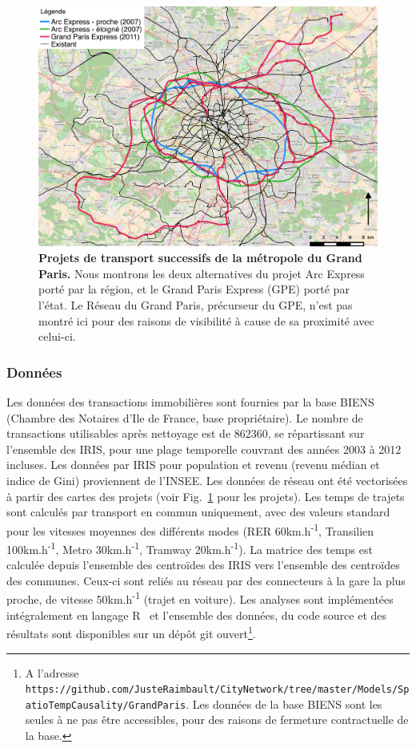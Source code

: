 \documentclass[french]{./sageo}
\begin{document}
\begin{figure}[h]
\centering
\includegraphics[width=12cm]{figures/reseaux}
\caption{\textbf{Projets de transport successifs de la métropole du Grand Paris.} Nous montrons les deux alternatives du projet Arc Express porté par la région, et le Grand Paris Express (GPE) porté par l'état. Le Réseau du Grand Paris, précurseur du GPE, n'est pas montré ici pour des raisons de visibilité à cause de sa proximité avec celui-ci.}
\label{fig:projects}
\end{figure}

\subsubsection{Données}

Les données des transactions immobilières sont fournies par la base BIENS (Chambre des Notaires d'Ile de France, base propriétaire). Le nombre de transactions utilisables après nettoyage est de 862360, se répartissant sur l'ensemble des IRIS, pour une plage temporelle couvrant des années 2003 à 2012 incluses. Les données par IRIS pour population et revenu (revenu médian et indice de Gini) proviennent de l'INSEE. Les données de réseau ont été vectorisées à partir des cartes des projets (voir Fig.~\ref{fig:projects} pour les projets). Les temps de trajets sont calculés par transport en commun uniquement, avec des valeurs standard pour les vitesses moyennes des différents modes (RER 60km.h\textsuperscript{-1}, Transilien 100km.h\textsuperscript{-1}, Metro 30km.h\textsuperscript{-1}, Tramway 20km.h\textsuperscript{-1}). La matrice des temps est calculée depuis l'ensemble des centroïdes des IRIS vers l'ensemble des centroïdes des communes. Ceux-ci sont reliés au réseau par des connecteurs à la gare la plus proche, de vitesse 50km.h\textsuperscript{-1} (trajet en voiture). Les analyses sont implémentées intégralement en langage R~\cite{rcoreteam} et l'ensemble des données, du code source et des résultats sont disponibles sur un dépôt git ouvert\footnote{A l'adresse\\\texttt{https://github.com/JusteRaimbault/CityNetwork/tree/master/Models/SpatioTempCausality/GrandParis}. Les données de la base BIENS sont les seules à ne pas être accessibles, pour des raisons de fermeture contractuelle de la base.}.
\end{document}
